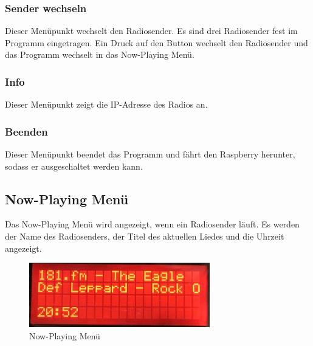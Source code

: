 \subsubsection{Sender wechseln}
Dieser Menüpunkt wechselt den Radiosender. Es sind drei Radiosender fest im Programm eingetragen. Ein Druck auf den Button wechselt den Radiosender und das Programm wechselt in das Now-Playing Menü.
\subsubsection{Info}
Dieser Menüpunkt zeigt die IP-Adresse des Radios an.
\subsubsection{Beenden}
Dieser Menüpunkt beendet das Programm und fährt den Raspberry herunter, sodass er ausgeschaltet werden kann.


\subsection{Now-Playing Menü}
Das Now-Playing Menü wird angezeigt, wenn ein Radiosender läuft. Es werden der Name des Radiosenders, der Titel des aktuellen Liedes und die Uhrzeit angezeigt.
\begin{figure}[H] 
  \centering
     \includegraphics[width=0.7\textwidth]{Bilder/playmenu.png}
  \caption{Now-Playing Menü}
  \label{fig:playmenu}
\end{figure}